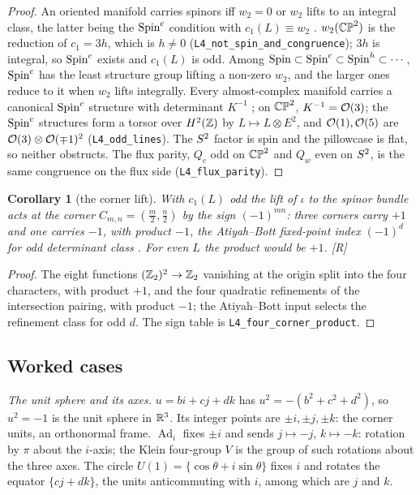 \documentclass[11pt,a4paper]{article}
\theoremstyle{plain}
\newtheorem{corollary}[theorem]{Corollary}
\theoremstyle{definition}
\theoremstyle{remark}
\newcommand{\Ad}{\operatorname{Ad}}
\newcommand{\rigR}{[\textup{R}]}
\begin{document}
\begin{proof}
An oriented manifold carries spinors iff $w_{2}=0$ or $w_{2}$ lifts to an integral class, the latter being the $\text{Spin}^c$ condition with $c_{1}(L)\equiv w_{2}$ \cite{LawsonMichelsohn}. $w_{2}(\mathbb{CP}^2)$ is the reduction of $c_{1}=3h$, which is $h\neq0$ (\texttt{L4\_not\_spin\_and\_congruence}); $3h$ is integral, so $\text{Spin}^c$ exists and $c_{1}(L)$ is odd. Among $\mathrm{Spin}\subset\text{Spin}^c\subset\mathrm{Spin}^{h}\subset\cdots$, $\text{Spin}^c$ has the least structure group lifting a non-zero $w_{2}$, and the larger ones reduce to it when $w_{2}$ lifts integrally. Every almost-complex manifold carries a canonical $\text{Spin}^c$ structure with determinant $K^{-1}$ \cite{LawsonMichelsohn,Friedrich}; on $\mathbb{CP}^2$, $K^{-1}=\mathcal{O}(3)$; the $\text{Spin}^c$ structures form a torsor over $H^{2}(\mathbb{Z})$ by $L\mapsto L\otimes E^{2}$, and $\mathcal{O}(1),\mathcal{O}(5)$ are $\mathcal{O}(3)\otimes\mathcal{O}(\mp1)^{2}$ (\texttt{L4\_odd\_lines}). The $S^2$ factor is spin and the pillowcase is flat, so neither obstructs. The flux parity, $Q_{c}$ odd on $\mathbb{CP}^2$ and $Q_{w}$ even on $S^2$, is the same congruence on the flux side (\texttt{L4\_flux\_parity}).
\end{proof}

\begin{corollary}[the corner lift]\label{cor:lift}
With $c_{1}(L)$ odd the lift of $\iota$ to the spinor bundle acts at the corner $C_{m,n}=(\tfrac m2,\tfrac n2)$ by the sign $(-1)^{mn}$: three corners carry $+1$ and one carries $-1$, with product $-1$, the Atiyah--Bott fixed-point index $(-1)^{d}$ for odd determinant class \cite{AtiyahBott}. For even $L$ the product would be $+1$. \rigR
\end{corollary}

\begin{proof}
The eight functions $(\mathbb{Z}_{2})^{2}\to\mathbb{Z}_{2}$ vanishing at the origin split into the four characters, with product $+1$, and the four quadratic refinements of the intersection pairing, with product $-1$; the Atiyah--Bott input selects the refinement class for odd $d$. The sign table is \texttt{L4\_four\_corner\_product}.
\end{proof}

\subsection{Worked cases}\label{sec:base-worked}

\emph{The unit sphere and its axes.} $u=bi+cj+dk$ has $u^{2}=-(b^{2}+c^{2}+d^{2})$, so $u^{2}=-1$ is the unit sphere in $\mathbb{R}^{3}$. Its integer points are $\pm i,\pm j,\pm k$: the corner units, an orthonormal frame. $\Ad_{i}$ fixes $\pm i$ and sends $j\mapsto-j$, $k\mapsto-k$: rotation by $\pi$ about the $i$-axis; the Klein four-group $V$ is the group of such rotations about the three axes. The circle $U(1)=\{\cos\theta+i\sin\theta\}$ fixes $i$ and rotates the equator $\{cj+dk\}$, the units anticommuting with $i$, among which are $j$ and $k$.
\end{document}
